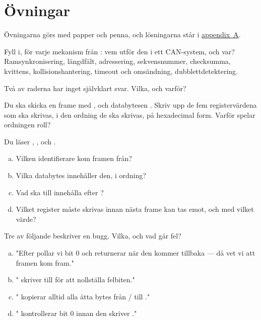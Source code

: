 \section*{Övningar}

Övningarna görs med papper och penna, och lösningarna står i
\hyperref[ch:losningar]{appendix~A}.

\label{ex:4:1}
Fyll i, för varje mekanism från : vem utför den i ett CAN-system, och var?
Ramsynkronisering, längdfält, adressering, sekvensnummer, checksumma, kvittens,
kollisionshantering, timeout och omsändning, dubblettdetektering.

Två av raderna har inget självklart svar. Vilka, och varför?

\label{ex:4:2}
Du ska skicka en frame med ,  och databytesen
. Skriv upp de fem registervärdena som ska skrivas, i den ordning de ska
skrivas, på hexadecimal form. Varför spelar ordningen roll?

\label{ex:4:3}
Du läser , ,
 och .
\begin{enumerate}[a)]
  \item Vilken identifierare kom framen från?
  \item Vilka databytes innehåller den, i ordning?
  \item Vad ska  till  innehålla efter ?
  \item Vilket register måste skrivas innan nästa frame kan tas emot, och med vilket värde?
\end{enumerate}

\label{ex:4:4}
Tre av följande beskriver en bugg. Vilka, och vad går fel?
\begin{enumerate}[a)]
  \item "Efter  pollar vi  bit 0 och returnerar  när den
    kommer tillbaka --- då vet vi att framen kom fram."
  \item " skriver  till  för att nollställa
    felbiten."
  \item " kopierar alltid alla åtta bytes från / till
    ."
  \item " kontrollerar  bit 0 innan den skriver ."
\end{enumerate}

